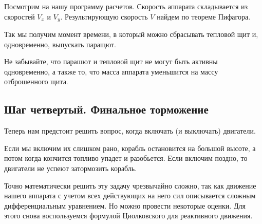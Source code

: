 \documentclass[12pt,a4paper]{article}
\begin{document}
Посмотрим на нашу программу расчетов. Скорость аппарата складывается из скоростей $V_x$ и
$V_y$. Результирующую скорость $V$ найдем по теореме Пифагора.

\hfill

\noindent{}

\hfill

Так мы получим момент времени, в который можно сбрасывать тепловой щит и, одновременно,
выпускать паращют.

\hfill

\noindent{}

\hfill

Не забывайте, что парашют и тепловой щит не могут быть активны одновременно, а также то,
что масса аппарата уменьшится на массу отброшенного щита.

\hfill

\noindent{}

\subsection{Шаг четвертый. Финальное торможение}

Теперь нам предстоит решить вопрос, когда включать (и выключать) двигатели.

Если мы включим их слишком рано, корабль остановится на большой высоте, а потом когда
кончится топливо упадет и разобьется. Если включим поздно, то двигатели не успеют
затормозить корабль.

Точно математически решить эту задачу чрезвычайно сложно, так как движение нашего аппарата
с учетом всех действующих на него сил описывается сложным дифференциальным уравнением. Но
можно провести некоторые оценки. Для этого снова воспользуемся формулой Циолковского для
реактивного движения.
\end{document}
